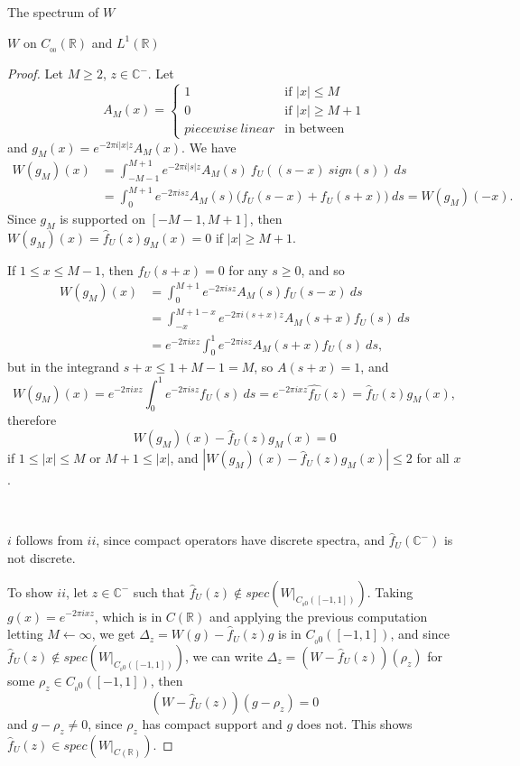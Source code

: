 \documentclass[12pt]{article}
\begin{document}
\begin{section}{The spectrum of $W$ }
\begin{subsection}{$W$ on $C_{_{0\!0}}(\mathbb{R})$ and $L^1(\mathbb{R})$}
\begin{proof} 
Let $M \ge 2$, $z \in \mathbb{C}^-$. Let 
$$
A_M(x)=
\begin{cases}
1  & \text{if } |x| \le M \\
0  & \text{if } |x| \ge M +1\\
piecewise \  linear & \text{in between}
\end{cases} 
$$ 
and $g_M(x) = e^{-2 \pi i |x| z} A_M(x)$. We have  
\begin{align*}
W(g_M)(x) &= \int_{-M-1}^{M+1} e^{-2 \pi i |s| z} A_M(s) \ f_U\!\left(  \left(s - x \right)\ sign(s) \right) \ ds \\
		&= \int_0^{M+1} e^{-2 \pi i s z} A_M(s) 
		\Big( f_U\!(  s - x ) + f_U\!(  s + x ) \Big) \ ds = W(g_M)(-x).
\end{align*} 
Since $g_M$ is supported on $[-M-1,M+1]$, then $W(g_M)(x) = \hat{f}_U(z) g_M(x) = 0$ if $|x| \ge M+1$.  

If $1 \le x \le M -1 $, then $f_U\!(  s + x ) = 0$ for any $s \ge 0$, and so
\begin{align*}
W(g_M)(x) &= \int_0^{M+1} e^{-2 \pi i s z} A_M(s) f_U\!(  s - x )  \ ds \\
 & = \int_{-x}^{M+1 - x} e^{-2 \pi i (s+x) z} A_M(s+x) f_U\!(  s  )  \ ds \\
 & = e^{-2 \pi i x z} \int_0^1 e^{-2 \pi i s z} A_M(s+x) f_U\!(  s  )  \ ds,
\end{align*}
but in the integrand $s+x \le 1 + M-1=M$, so $A(s+x)=1$, and
$$
W(g_M)(x) = e^{-2 \pi i x z} \int_0^1 e^{-2 \pi i s z} f_U\!(  s  )  \ ds 
= e^{-2 \pi i x z} \hat{f_U}(z) = \hat{f}_U(z) g_M(x),
$$
therefore
$$
W(g_M)(x) - \hat{f}_U(z) g_M(x) = 0
$$
if $1 \le |x| \le M$ or $M+1 \le |x|$, and $|W(g_M)(x) - \hat{f}_U(z) g_M(x)| \le 2$ for all $x$.  

\  
\  


$i$ follows from $ii$, since compact operators have discrete spectra, and $\hat{f}_U(\mathbb{C}^-)$ is not discrete.

To show $ii$, let $z \in \mathbb{C}^-$ such that $\hat{f}_U(z) \notin spec\left(W\Big|_{C_{_0\!0}([-1,1])}   \right) $. Taking $g(x) = e^{-2 \pi i x z}$, which is in $C(\mathbb{R})$ and applying the previous computation letting $M \leftarrow \infty$, we get $\Delta_z = W(g) - \hat{f}_U(z)g$ is in $C_{_0\!0}([-1,1])$, and since $\hat{f}_U(z) \notin spec\left(W\Big|_{C_{_0\!0}([-1,1])}   \right) $, we can write $\Delta_z = (W - \hat{f}_U(z))(\rho_z) $ for some $\rho_z \in C_{_0\!0}([-1,1])$, then
$$
(W - \hat{f}_U(z))(g - \rho_z) = 0
$$
and $g - \rho_z \ne 0$, since $\rho_z$ has compact support and $g$ does not. This shows $\hat{f}_U(z) \in spec\left(W\Big|_{C(\mathbb{R})}   \right) $.  


\end{proof}
\end{subsection}
\end{section}
\end{document}
